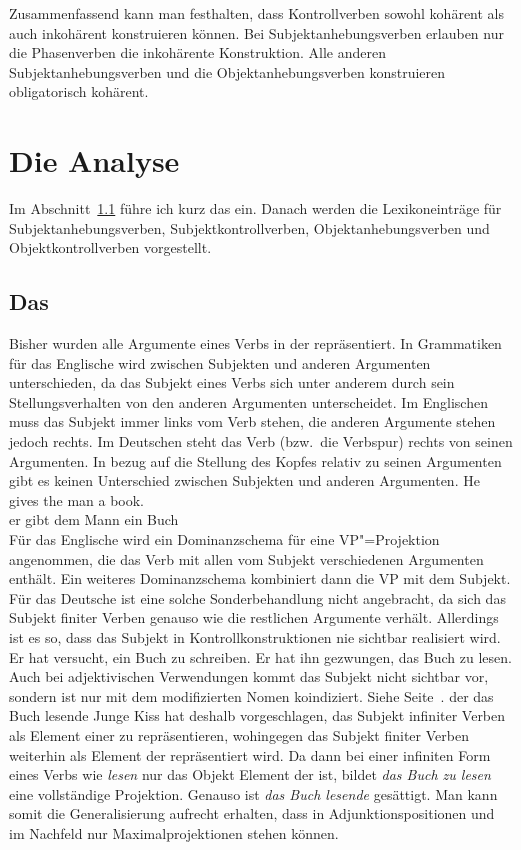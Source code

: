 \noindent
Zusammenfassend kann man festhalten, dass Kontrollverben sowohl kohärent als auch inkohärent
konstruieren können. Bei Subjektanhebungsverben erlauben nur die Phasenverben die inkohärente
Konstruktion. Alle anderen Subjektanhebungsverben und die Objektanhebungsverben konstruieren obligatorisch
kohärent.


\section{Die Analyse}
\label{sec-anhebung-anal}

Im Abschnitt~\ref{sec-subj-merkmal} führe ich kurz das \subjm ein. Danach werden die Lexikoneinträge
für Subjektanhebungsverben, Subjektkontrollverben, Objektanhebungsverben und Objektkontrollverben
vorgestellt.

\subsection{Das \subjm}
\label{sec-subj-merkmal}

Bisher wurden alle Argumente eines Verbs in der \compsl repräsentiert.
In Grammatiken für das Englische wird zwischen Subjekten und anderen Argumenten
unterschieden, da das Subjekt eines Verbs sich unter anderem durch sein
Stellungsverhalten von den anderen Argumenten unterscheidet. Im Englischen
muss das Subjekt immer links vom Verb stehen, die anderen Argumente stehen
jedoch rechts. Im Deutschen steht das Verb (bzw.\ die Verbspur) rechts von seinen
Argumenten. In bezug auf die Stellung des Kopfes relativ zu seinen Argumenten
gibt es keinen Unterschied zwischen Subjekten und anderen Argumenten.
\ea
\gll He gives the man a book.\\
     er gibt dem Mann ein Buch\\
\z
Für das Englische wird ein Dominanzschema für eine VP"=Projektion
angenommen, die das Verb mit allen vom Subjekt verschiedenen Argumenten enthält.
Ein weiteres Dominanzschema kombiniert dann die VP mit dem Subjekt. Für das Deutsche
ist eine solche Sonderbehandlung nicht angebracht, da sich das Subjekt finiter Verben
genauso wie die restlichen Argumente verhält. Allerdings ist es so, dass das Subjekt
in Kontrollkonstruktionen nie sichtbar realisiert wird.
\eal
\ex Er hat versucht, ein Buch zu schreiben.
\ex Er hat ihn gezwungen, das Buch zu lesen.
\zl
Auch bei adjektivischen Verwendungen kommt das Subjekt nicht sichtbar
vor, sondern ist nur mit dem modifizierten Nomen koindiziert. Siehe Seite~\pageref{bsp-nominativ-adj}.
\ea
der das Buch lesende Junge
\z
Kiss \citeyearpar{Kiss92,Kiss95a} hat deshalb vorgeschlagen, das Subjekt infiniter
Verben als Element einer \subjl zu repräsentieren, wohingegen das Subjekt
finiter Verben weiterhin als Element der \compsl repräsentiert wird. Da dann
bei einer infiniten Form eines Verbs wie \emph{lesen} nur das Objekt Element
der \compsl ist, bildet \emph{das Buch zu lesen} eine vollständige Projektion.
Genauso ist \emph{das Buch lesende} gesättigt.
Man kann somit die Generalisierung aufrecht erhalten, dass in Adjunktionspositionen
und im Nachfeld nur Maximalprojektionen stehen können. 

